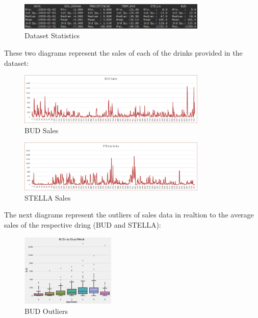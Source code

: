 \begin{figure}[H]
    \centering
    \includegraphics[width=0.8\textwidth]{assets/dataset-stats.jpeg}
    \caption{Dataset Statistics}
    \label{fig:dataset_stats}
    \end{figure}

These two diagrams represent the sales of each of the drinks provided in the dataset:
\\
\begin{figure}[H]
    \centering
    \includegraphics[width=0.8\textwidth]{assets/BUD.png}
    \caption{BUD Sales}
    \label{fig:bud_sales}
    \end{figure}

\begin{figure}[H]
    \centering
    \includegraphics[width=0.8\textwidth]{assets/stella.png}
    \caption{STELLA Sales}
    \label{fig:stella_sales}
    \end{figure}

The next diagrams represent the outliers of sales data in realtion to the average sales of the respective dring (BUD and STELLA):\\

\begin{figure}[H]
    \centering
    \includegraphics[width=0.4\textwidth]{assets/BUD-OUTLIERS.jpeg}
    \caption{BUD Outliers}
    \label{fig:bud_outliers}
    \end{figure}

